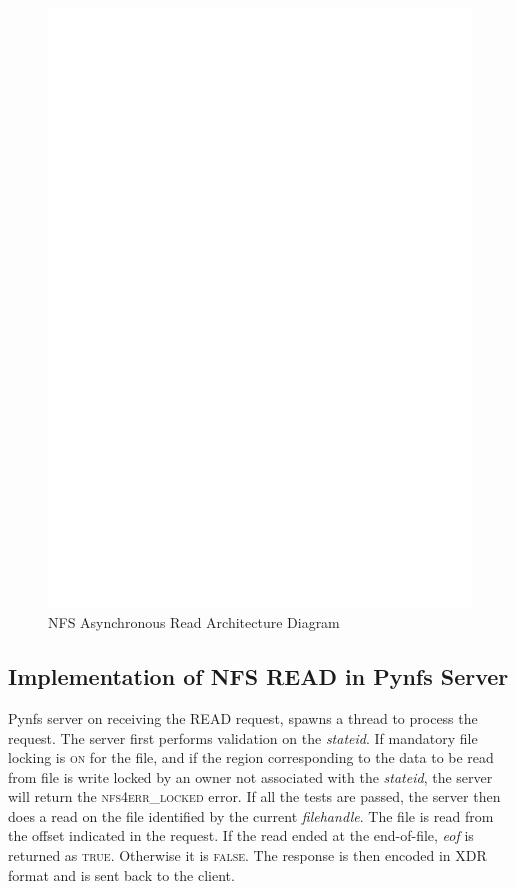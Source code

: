 \begin{figure}
\centering
\includegraphics[scale=0.7]{figures/AsyncRead.eps}
\caption{NFS Asynchronous Read Architecture Diagram}
\label{fig:NFSAsyncReadArch}
\end{figure}

\subsection{Implementation of NFS READ in Pynfs Server}
Pynfs server on receiving the READ request, spawns a thread to process the request. The server first performs validation on the \textit{stateid}. If mandatory file locking is \textsc{on} for the file, and if the region corresponding to the data to be read from file is write locked by an owner not associated with the \textit{stateid}, the server will return the \textsc{nfs4err\_locked} error. If all the tests are passed, the server then does a read on the file identified by the current \textit{filehandle}. The file is read from the offset indicated in the request.  If the read ended at the end-of-file, \textit{eof} is returned as  \textsc{true}. Otherwise it is \textsc{false}. The response is then encoded in XDR format and is sent back to the client.
	
